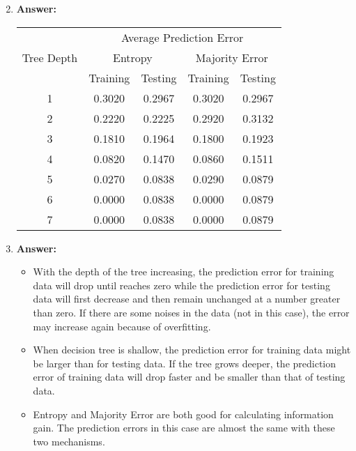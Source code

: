 \documentclass[12pt, fullpage,letterpaper]{article}
\begin{document}
\begin{enumerate}
\setcounter{enumi}{1}
\item \textbf{Answer:}\\
\begin{table}[H]
\centering
\begin{tabular}{c|cccc}
\multirow{3}{*}{Tree Depth} & \multicolumn{4}{c}{Average Prediction Error}\\
\cline{2-5}
& \multicolumn{2}{c}{Entropy} & \multicolumn{2}{c}{Majority Error}\\
\cline{2-5}
& Training & Testing &Training & Testing\\
\hline \hline
1 & 0.3020 & 0.2967 & 0.3020 & 0.2967 \\
2 & 0.2220 & 0.2225 & 0.2920 & 0.3132 \\
3 & 0.1810 & 0.1964 & 0.1800 & 0.1923 \\
4 & 0.0820 & 0.1470 & 0.0860 & 0.1511 \\
5 & 0.0270 & 0.0838 & 0.0290 & 0.0879 \\
6 & 0.0000 & 0.0838 & 0.0000 & 0.0879 \\
7 & 0.0000 & 0.0838 & 0.0000 & 0.0879 \\
\end{tabular}
\end{table}
\item \textbf{Answer:}
\begin{itemize}
\item With the depth of the tree increasing, the prediction error for training data will drop until reaches zero while the prediction error for testing data will first decrease and then remain unchanged at a number greater than zero. If there are some noises in the data (not in this case), the error may increase again because of overfitting.\\
\item When decision tree is shallow, the prediction error for training data might be larger than for testing data. If the tree grows deeper, the prediction error of training data will drop faster and be smaller than that of testing data.\\
\item Entropy and Majority Error are both good for calculating information gain.  The prediction errors in this case are almost the same with these two mechanisms.
\end{itemize}


\end{enumerate}
\end{document}
